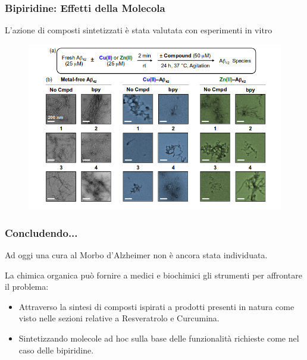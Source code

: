 \documentclass[9pt]{beamer}
\begin{document}
\begin{frame}
	\frametitle{Bipiridine: Effetti della Molecola}
	L'azione di composti sintetizzati è stata valutata con esperimenti in vitro
	
	\begin{figure}
		\includegraphics[width=\textwidth]{immagini/ris_bpy2.png}
	\end{figure}
\end{frame}

\begin{frame}
	\frametitle{Concludendo...}
	Ad oggi una cura al Morbo d'Alzheimer non è ancora stata individuata.
	
	La chimica organica può fornire a medici e biochimici gli strumenti per affrontare il problema:
	\begin{itemize}

		\item Attraverso la sintesi di composti ispirati a prodotti 	presenti in natura come visto nelle sezioni relative a Resveratrolo e Curcumina.
		\item Sintetizzando molecole ad hoc sulla base delle funzionalità richieste come nel caso delle bipiridine.
		      
	\end{itemize}
\end{frame}


\begin{frame}
\end{frame}
\end{document}

